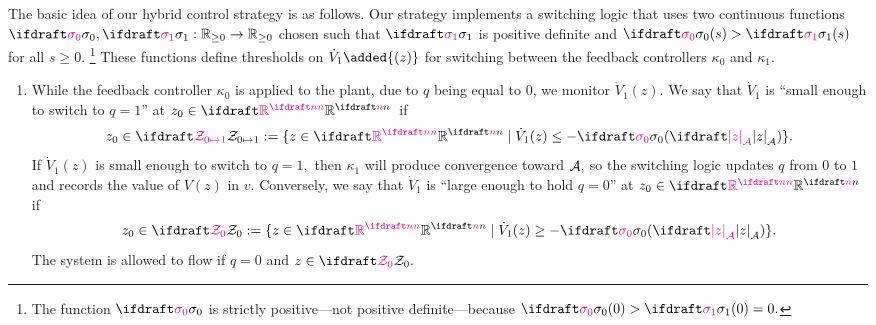 The basic idea of our hybrid control strategy is as follows. 
Our strategy implements a switching logic that 
uses two continuous functions 
$\sigmazero, \sigmaone : \nonnegativereals \to \nonnegativereals$
chosen such that
$\sigmaone$ is positive definite 
and $\sigmazero(s) > \sigmaone(s)$ for all $s \geq 0.$%
\footnote{The function $\sigmazero$ is strictly 
positive---not positive definite---because $\sigmazero(0) > \sigmaone(0) = 0.$} 
These functions define thresholds on
$\dot V_1\added{(z)}$ for switching between the 
feedback controllers $\kappa_0$ and $\kappa_1.$
{%
\setupAssumption[S]
\begin{enumerate}
    \addtocounter{enumi}{-1}
    \item While the feedback controller $\kappa_0$ is applied to 
    the plant, due to $q$ being equal to $0$, we monitor $\dot V_1(z).$
    We say that $\dot V_1$ is 
    ``small enough to switch to $q=1$'' at $\zzero \in\plantstatespace$~if
    \begin{equation}
        \label{eq:Zswitchtoone}
        \zzero\in \calZswitchtoone 
        := \{z \in \plantstatespace \mid \dot V_1(z) \leq -\sigmazero(\distA{z})\}.
    \end{equation} 
    If $\dot V_1(z)$ is small enough to switch to $q=1,$
    then $\kappa_1$ will produce convergence toward ${\mathcal{A}},$ 
    so the switching logic updates 
    $q$ from $0$ to $1$ and records the value of $V(z)$ in $v.$ 
    Conversely, we say that $\dot V_1$ is  ``large enough to hold $q=0$'' 
    at $\zzero \in\plantstatespace$ if
    \begin{equation}
        \label{eq:Zholdzero}
        \zzero\in \calZholdzero 
        := \{z \in \plantstatespace \mid \dot V_1(z) \geq -\sigmazero(\distA{z})\}.
    \end{equation} 
    The system is allowed to flow if $q=0$ and $z\in \calZholdzero.$
    \label{item:q=0 switching criterion}


\end{enumerate}}
